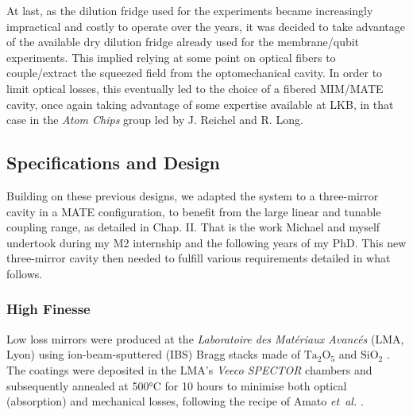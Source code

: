 At last, as the dilution fridge used for the experiments became increasingly impractical and costly to operate over the years, it was decided to take advantage of the available dry dilution fridge already used for the membrane/qubit experiments. This implied relying at some point on optical fibers to couple/extract the squeezed field from the optomechanical cavity. In order to limit optical losses, this eventually led to the choice of a fibered MIM/MATE cavity, once again taking advantage of some expertise available at LKB, in that case in the {\it Atom Chips} group led by J. Reichel and R. Long. 



\subsection{Specifications and Design}
Building on these previous designs, we adapted the system to a three-mirror cavity in a MATE configuration, to benefit from the large linear and tunable coupling range, as detailed in Chap. II. That is the work Michael and myself undertook during my M2 internship and the following years of my PhD.
This new three-mirror cavity then needed to fulfill various requirements detailed in what follows. 

\subsubsection{High Finesse} 

Low loss mirrors were produced at the \textit{Laboratoire des Matériaux Avancés} (LMA, Lyon) using ion-beam-sputtered (IBS) Bragg stacks made of $\mathrm{Ta_2O_5}$ and $\mathrm{SiO_2}$ \cite{amato,Amato_2018}. The coatings were deposited in the LMA's \textit{Veeco SPECTOR} chambers and subsequently annealed at 500°C for 10 hours to minimise both optical (absorption) and mechanical losses, following the recipe of Amato \textit{et~al.} \cite{amato}.\\ 



